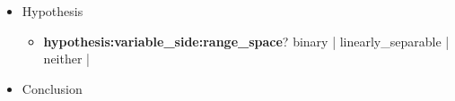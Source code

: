 \documentclass[onecolumn]{ctexart}
\begin{document}
\begin{itemize}
    \item  Hypothesis
    \begin{itemize}




            



        \item  \textbf{hypothesis:variable\_side:range\_space}? \qquad
            {\color{LimeGreen} binary}  |
            {\color{red}   linearly\_separable}  |
            {\color{red}   neither}  |

    \end{itemize}

    \item  Conclusion  %
    \begin{itemize}


\end{itemize}
\end{itemize}
\end{document}
